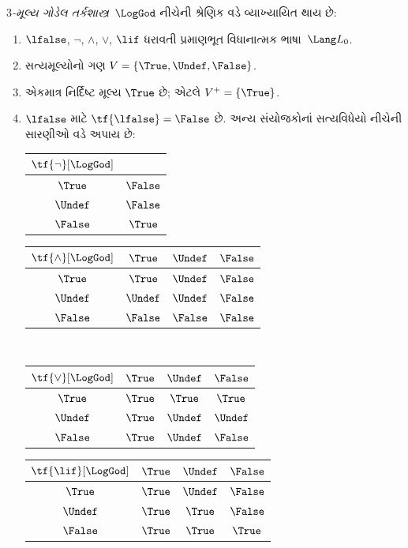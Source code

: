 \begin{defn}
\emph{$3$-મૂલ્ય ગોડેલ તર્કશાસ્ત્ર}~$\LogGod$ નીચેની શ્રેણિક વડે
વ્યાખ્યાયિત થાય છે:
\begin{enumerate}
  \item $\lfalse$, $\lnot$, $\land$, $\lor$, $\lif$
  ધરાવતી પ્રમાણભૂત વિધાનાત્મક ભાષા~$\Lang L_0$.
  \item સત્યમૂલ્યોનો ગણ $V = \{\True, \Undef, \False\}$.
  \item એકમાત્ર નિર્દિષ્ટ મૂલ્ય $\True$ છે; એટલે $V^+ = \{\True\}$.
  \item $\lfalse$ માટે $\tf{\lfalse} = \False$ છે. અન્ય
  સંયોજકોનાં સત્યવિધેયો નીચેની સારણીઓ વડે અપાય છે:
  \begin{center}
    \begin{tabular}{c|c}
      $\tf{\lnot}[\LogGod]$ & \\
      \hline
      $\True$ & $\False$ \\
      $\Undef$ & $\False$ \\
      $\False$ & $\True$
    \end{tabular}
    \quad
    \begin{tabular}{c|ccc}
      $\tf{\land}[\LogGod]$ & $\True$ & $\Undef$ & $\False$ \\
      \hline
      $\True$ & $\True$ & $\Undef$ & $\False$ \\
      $\Undef$ & $\Undef$ & $\Undef$ & $\False$\\
      $\False$ & $\False$ & $\False$ & $\False$
    \end{tabular}
    \\[2ex]
    \begin{tabular}{c|ccc}
      $\tf{\lor}[\LogGod]$ & $\True$ & $\Undef$ & $\False$ \\
      \hline
      $\True$ & $\True$ & $\True$ & $\True$ \\
      $\Undef$ & $\True$ & $\Undef$ & $\Undef$ \\
      $\False$ & $\True$ & $\Undef$ & $\False$
    \end{tabular}
    \quad
    \begin{tabular}{c|ccc}
      $\tf{\lif}[\LogGod]$ & $\True$ & $\Undef$ & $\False$ \\
      \hline
      $\True$ & $\True$ & $\Undef$ & $\False$ \\
      $\Undef$ & $\True$ & $\True$ & $\False$ \\
      $\False$ & $\True$ & $\True$ & $\True$
    \end{tabular}
  \end{center}
\end{enumerate}
\end{defn}

